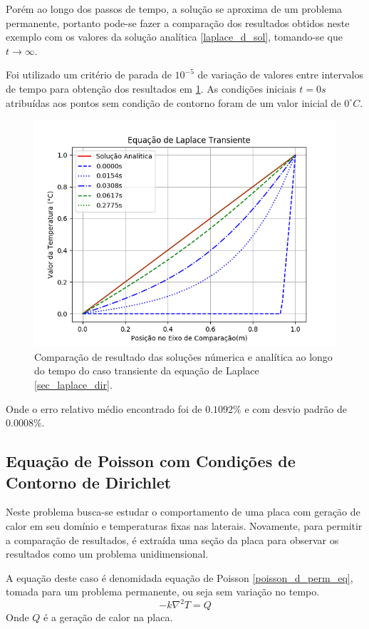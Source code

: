Porém ao longo dos passos de tempo, a solução se aproxima de um problema permanente, portanto pode-se fazer a comparação dos resultados obtidos neste exemplo com os valores da solução analítica \ref{laplace_d_sol}, tomando-se que $t\rightarrow \infty$.

Foi utilizado um critério de parada de $10^{-5}$ de variação de valores entre intervalos de tempo para obtenção dos resultados em \ref{laplace_d_trans_comp}.
As condições iniciais $t=0s$ atribuídas aos pontos sem condição de contorno foram de um valor inicial de $0^{\circ}C$.
\begin{figure}[H]
    \centering
    \includegraphics[width=.7\linewidth]{figures/laplace_dirichlet_transient_comparison.png}
    \caption{Comparação de resultado das soluções númerica e analítica ao longo do tempo do caso transiente da equação de Laplace \ref{sec_laplace_dir}.}
    \label{laplace_d_trans_comp}
\end{figure}
Onde o erro relativo médio encontrado foi de $0.1092\%$ e com desvio padrão de $0.0008\%$.


\subsection{\textbf{Equação de Poisson com Condições de Contorno de Dirichlet}}
\label{sec_poisson_dir}
Neste problema busca-se estudar o comportamento de uma placa com geração de calor em seu domínio e temperaturas fixas nas laterais.
Novamente, para permitir a comparação de resultados, é extraída uma seção da placa para observar os resultados como um problema unidimensional.

A equação deste caso é denomidada equação de Poisson \ref{poisson_d_perm_eq}, tomada para um problema permanente, ou seja sem variação no tempo.
\begin{equation}
    -k\nabla^2 T = Q
    \label{poisson_d_perm_eq} 
\end{equation}
Onde $Q$ é a geração de calor na placa.

